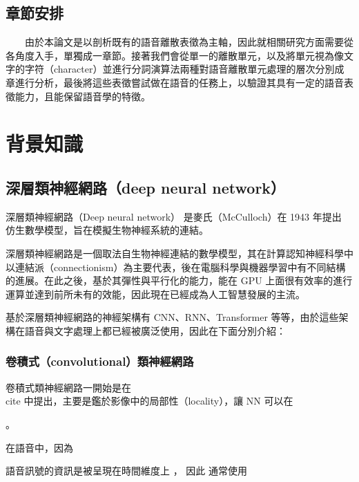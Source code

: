 \section{章節安排}

　　由於本論文是以剖析既有的語音離散表徵為主軸，因此就相關研究方面需要從各角度入手，單獨成一章節。接著我們會從單一的離散單元，以及將單元視為像文字的字符（character）並進行分詞演算法兩種對語音離散單元處理的層次分別成章進行分析，最後將這些表徵嘗試做在語音的任務上，以驗證其具有一定的語音表徵能力，且能保留語音學的特徵。




\chapter{背景知識}

\section{深層類神經網路（deep neural network）}

深層類神經網路（Deep neural network） 是麥氏（McCulloch）在 1943 年提出 \cite{mcculloch1943logical} 仿生數學模型，旨在模擬生物神經系統的連結。

深層類神經網路是一個取法自生物神經連結的數學模型，其在計算認知神經科學中以連結派（connectionism）為主要代表，後在電腦科學與機器學習中有不同結構的進展。在此之後，基於其彈性與平行化的能力，能在 GPU 上面很有效率的進行運算並達到前所未有的效能，因此現在已經成為人工智慧發展的主流。

基於深層類神經網路的神經架構有 CNN、RNN、Transformer 等等，由於這些架構在語音與文字處理上都已經被廣泛使用，因此在下面分別介紹：


\subsection{卷積式（convolutional）類神經網路}

卷積式類神經網路一開始是在 \\cite{} 中提出，主要是鑑於影像中的局部性（locality），讓 NN 可以在

。

在語音中，因為

語音訊號的資訊是被呈現在時間維度上
，
因此
通常使用


